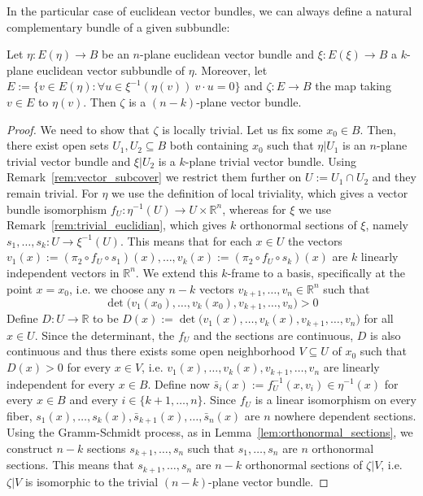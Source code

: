 In the particular case of euclidean vector bundles, we can always define a natural complementary bundle of a given subbundle:
\begin{proposition} Let $\eta:E(\eta)\to B$ be an $n$-plane euclidean vector bundle and $\xi:E(\xi)\to B$ a $k$-plane euclidean vector subbundle of $\eta$. Moreover, let $E:=\{v\in E(\eta):\forall u\in\xi^{-1}(\eta(v))\ v\cdot u=0\}$ and $\zeta:E\to B$ the map taking $v\in E$ to $\eta(v)$. Then $\zeta$ is a $(n-k)$-plane vector bundle.
\end{proposition}
\begin{proof} We need to show that $\zeta$ is locally trivial. Let us fix some $x_0\in B$. Then, there exist open sets $U_1,U_2\subseteq B$ both containing $x_0$ such that $\eta|U_1$ is an $n$-plane trivial vector bundle and $\xi|U_2$ is a $k$-plane trivial vector bundle. Using Remark~\ref{rem:vector_subcover} we restrict them further on $U:=U_1\cap U_2$ and they remain trivial. For $\eta$ we use the definition of local triviality, which gives a vector bundle isomorphism $f_U:\eta^{-1}(U)\to U\times\mathbb{R}^n$, whereas for $\xi$ we use Remark~\ref{rem:trivial_euclidian}, which gives $k$ orthonormal sections of $\xi$, namely $s_1,\ldots,s_k:U\to\xi^{-1}(U)$. This means that for each $x\in U$ the vectors $v_1(x):=(\pi_2\circ f_U\circ s_1)(x),\ldots,v_k(x):=(\pi_2\circ f_U\circ s_k)(x)$ are $k$ linearly independent vectors in $\mathbb{R}^n$. We extend this $k$-frame to a basis, specifically at the point $x=x_0$, i.e. we choose any $n-k$ vectors $v_{k+1},\ldots,v_n\in\mathbb{R}^n$ such that
\[\det\big(v_1(x_0),\ldots,v_k(x_0),v_{k+1},\ldots,v_n\big)>0\]
Define $D:U\to\mathbb{R}$ to be $D(x):=\det\big(v_1(x),\ldots,v_k(x),v_{k+1},\ldots,v_n\big)$ for all $x\in U$. Since the determinant, the $f_U$ and the sections are continuous, $D$ is also continuous and thus there exists some open neighborhood $V\subseteq U$ of $x_0$ such that $D(x)>0$ for every $x\in V$, i.e. $v_1(x),\ldots,v_k(x),v_{k+1},\ldots,v_n$ are linearly independent for every $x\in B$. Define now $\bar{s}_i(x):=f_U^{-1}(x,v_i)\in\eta^{-1}(x)$ for every $x\in B$ and every $i\in\{k+1,\ldots,n\}$. Since $f_U$ is a linear isomorphism on every fiber, $s_1(x),\ldots,s_k(x),\bar{s}_{k+1}(x),\ldots,\bar{s}_n(x)$ are $n$ nowhere dependent sections. Using the Gramm-Schmidt process, as in Lemma~\ref{lem:orthonormal_sections}, we construct $n-k$ sections $s_{k+1},\ldots,s_n$ such that $s_1,\ldots,s_n$ are $n$ orthonormal sections. This means that $s_{k+1},\ldots,s_n$ are $n-k$ orthonormal sections of $\zeta|V$, i.e. $\zeta|V$ is isomorphic to the trivial $(n-k)$-plane vector bundle.
\end{proof}

